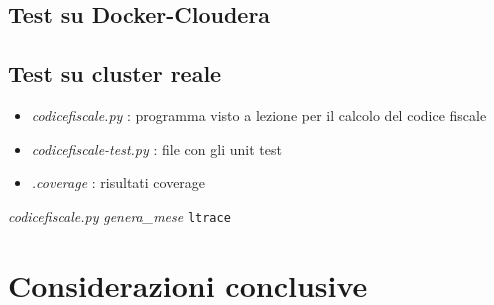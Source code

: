 \documentclass{article}
\newcommand{\filename}[1]{\textit{#1}}
\newcommand{\function}[1]{\textit{#1}}
\newcommand{\command}[1]{\texttt{#1}}
\begin{document}
\subsection{Test su Docker-Cloudera}
\subsection{Test su cluster reale}


\begin{itemize}
    \item \filename{codicefiscale.py} : programma visto a lezione per il calcolo del codice fiscale 
    \item \filename{codicefiscale-test.py} : file con gli unit test
    \item \filename{.coverage} : risultati coverage
\end{itemize}

\filename{codicefiscale.py}
\function{genera\_mese}
\command{ltrace}

\section{Considerazioni conclusive}



\newpage




\nocite{crawler}
\end{document}
